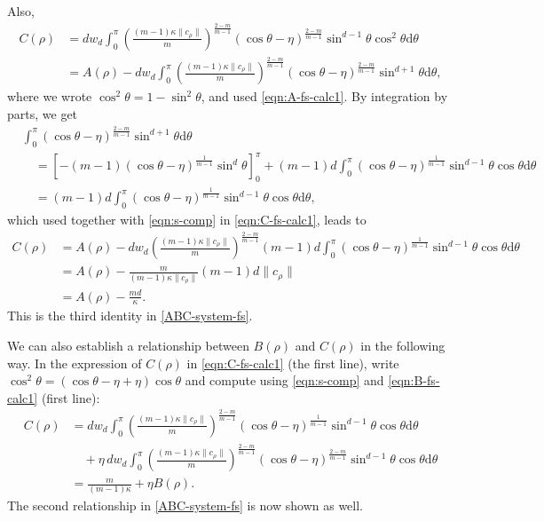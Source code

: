 \documentclass[11pt]{amsart}
\newcommand{\bbs}{\mathbb S}
\def\d{\mathrm{d}}
\newcommand{\dx}{\mathrm{d}S (x)}
\newcommand{\dm}{d} %
\begin{document}
Also, 
\begin{equation}
\label{eqn:C-fs-calc1}
\begin{aligned}
C(\rho)
&=\dm w_\dm\int_0^\pi\left(\frac{(m-1)\kappa \|c_\rho\|}{m}\right)^{\frac{2-m}{m-1}}\left(\cos\theta-\eta\right)^{\frac{2-m}{m-1}}\sin^{\dm-1}\theta \cos^2\theta\d\theta \\
&= A(\rho) - \dm w_\dm\int_0^\pi\left(\frac{(m-1)\kappa \|c_\rho\|}{m}\right)^{\frac{2-m}{m-1}}\left(\cos\theta-\eta\right)^{\frac{2-m}{m-1}}\sin^{\dm+1}\theta \d\theta,
\end{aligned}
\end{equation}
where we wrote $\cos^2 \theta = 1- \sin^2 \theta$, and used \eqref{eqn:A-fs-calc1}. 
By integration by parts, we get
\begin{align*}
&\int_0^\pi (\cos\theta-\eta)^{\frac{2-m}{m-1}}\sin^{\dm+1}\theta\d\theta\\
&\quad =\left[-(m-1)(\cos\theta-\eta)^{\frac{1}{m-1}}\sin^\dm\theta\right]_0^\pi+(m-1)\dm\int_0^\pi (\cos\theta-\eta)^{\frac{1}{m-1}}\sin^{\dm-1}\theta\cos\theta\d\theta\\
&\quad =(m-1)\dm\int_0^\pi (\cos\theta-\eta)^{\frac{1}{m-1}}\sin^{\dm-1}\theta\cos\theta\d\theta,
\end{align*}
which used together with \eqref{eqn:s-comp} in \eqref{eqn:C-fs-calc1}, leads to
\begin{equation}
\label{eqn:C-fs-calc2}
\begin{aligned}
   C(\rho) &= A(\rho) - \dm w_\dm \left(\frac{(m-1)\kappa \|c_\rho\|}{m}\right)^{\frac{2-m}{m-1}} (m-1) \dm \int_0^\pi (\cos\theta-\eta)^{\frac{1}{m-1}}\sin^{\dm-1}\theta\cos\theta\d\theta \\
   & = A(\rho) - \frac{m}{(m-1)\kappa \|c_\rho\|} (m-1) \dm \|c_\rho\| \\
   & = A(\rho) - \frac{m \dm }{\kappa}.
\end{aligned}
\end{equation}
This is the third identity in \eqref{ABC-system-fs}.

We can also establish a relationship between $B(\rho)$ and $C(\rho)$ in the following way. In the expression of $C(\rho)$ in \eqref{eqn:C-fs-calc1} (the first line), write $\cos^2 \theta = (\cos \theta - \eta + \eta) \cos \theta$ and compute using  \eqref{eqn:s-comp} and \eqref{eqn:B-fs-calc1} (first line):
\begin{equation}
\label{eqn:C-fs-calc3}
\begin{aligned}
C(\rho)&= \dm w_\dm\int_0^\pi\left(\frac{(m-1)\kappa \|c_\rho\|}{m}\right)^{\frac{2-m}{m-1}}\left(\cos\theta-\eta\right)^{\frac{1}{m-1}}\sin^{\dm-1}\theta \cos\theta\d\theta \\
&\quad + \eta \, \dm w_\dm\int_0^\pi\left(\frac{(m-1)\kappa \|c_\rho\|}{m}\right)^{\frac{2-m}{m-1}}\left(\cos\theta-\eta\right)^{\frac{2-m}{m-1}}\sin^{\dm-1}\theta \cos\theta\d\theta \\
&=\frac{m}{(m-1)\kappa}+\eta B(\rho).
\end{aligned}
\end{equation}
The second relationship in \eqref{ABC-system-fs} is now shown as well.
\end{document}

